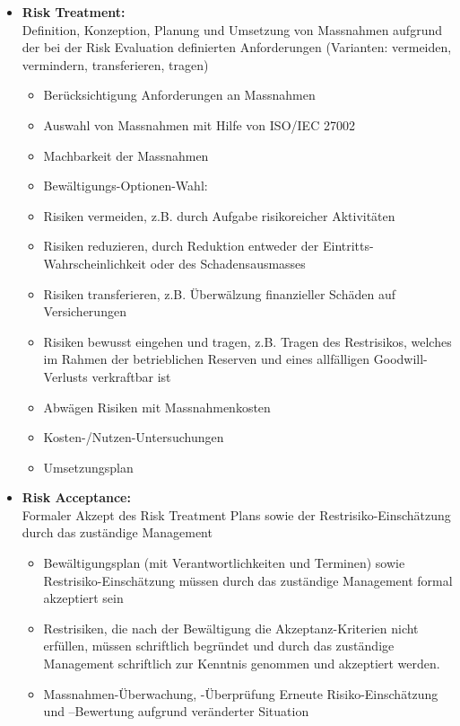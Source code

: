 \documentclass[10pt,a4paper]{article}
\begin{document}
\begin{itemize}[noitemsep,topsep=0pt,leftmargin=*]
\begin{itemize}[noitemsep,topsep=0pt,leftmargin=*]
    \end{itemize}
    \item \textbf{Risk Treatment:}\\Definition, Konzeption, Planung und
    Umsetzung von Massnahmen aufgrund der bei der
    Risk Evaluation definierten Anforderungen (Varianten:
    vermeiden, vermindern, transferieren, tragen)
    \begin{itemize}[noitemsep,topsep=0pt,leftmargin=*]
        \item Berücksichtigung Anforderungen an Massnahmen
        \item Auswahl von Massnahmen mit Hilfe von ISO/IEC 27002
        \item Machbarkeit der Massnahmen
        \item Bewältigungs-Optionen-Wahl:
        \item Risiken vermeiden, z.B. durch Aufgabe risikoreicher Aktivitäten
        \item Risiken reduzieren, durch Reduktion entweder der Eintritts-Wahrscheinlichkeit oder des Schadensausmasses
        \item Risiken transferieren, z.B. Überwälzung finanzieller Schäden auf Versicherungen
        \item Risiken bewusst eingehen und tragen,  z.B. Tragen des Restrisikos, welches im Rahmen der betrieblichen Reserven und eines allfälligen Goodwill-Verlusts verkraftbar ist
        \item Abwägen Risiken mit Massnahmenkosten
        \item Kosten-/Nutzen-Untersuchungen
        \item Umsetzungsplan
    \end{itemize}
    \item \textbf{Risk Acceptance:}\\Formaler Akzept des Risk
    Treatment Plans sowie der Restrisiko-Einschätzung
    durch das zuständige Management
    \begin{itemize}[noitemsep,topsep=0pt,leftmargin=*]
        \item Bewältigungsplan (mit Verantwortlichkeiten und Terminen) sowie Restrisiko-Einschätzung müssen durch das zuständige Management formal akzeptiert sein
        \item Restrisiken, die nach der Bewältigung die Akzeptanz-Kriterien nicht erfüllen, müssen schriftlich begründet und durch das zuständige Management schriftlich zur Kenntnis genommen und akzeptiert werden.
        \item Massnahmen-Überwachung, -Überprüfung Erneute Risiko-Einschätzung und –Bewertung aufgrund veränderter Situation

\end{itemize}
\end{itemize}
\end{document}
